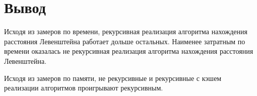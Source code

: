 \section*{Вывод}

Исходя из замеров по времени, рекурсивная реализация алгоритма нахождения расстояния Левенштейна работает дольше остальных. Наименее затратным по времени оказалась не рекурсивная реализация алгоритма нахождения расстояния Левенштейна.

Исходя из замеров по памяти, не рекурсивные и рекурсивные с кэшем реализации алгоритмов проигрывают рекурсивным.